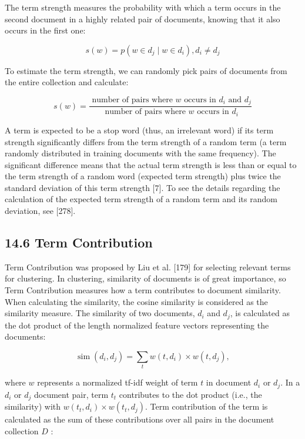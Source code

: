\documentclass[10pt]{book}
\begin{document}
The term strength measures the probability with which a term occurs in the second document in a highly related pair of documents, knowing that it also occurs in the first one:


\begin{equation*}
s(w)=p\left(w \in d_{j} \mid w \in d_{i}\right), d_{i} \neq d_{j} \tag{14.21}
\end{equation*}


To estimate the term strength, we can randomly pick pairs of documents from the entire collection and calculate:


\begin{equation*}
s(w)=\frac{\text { number of pairs where } w \text { occurs in } d_{i} \text { and } d_{j}}{\text { number of pairs where } w \text { occurs in } d_{i}} \tag{14.22}
\end{equation*}


A term is expected to be a stop word (thus, an irrelevant word) if its term strength significantly differs from the term strength of a random term (a term randomly distributed in training documents with the same frequency). The significant difference means that the actual term strength is less than or equal to the term strength of a random word (expected term strength) plus twice the standard deviation of this term strength [7]. To see the details regarding the calculation of the expected term strength of a random term and its random deviation, see [278].

\subsection*{14.6 Term Contribution}
Term Contribution was proposed by Liu et al. [179] for selecting relevant terms for clustering. In clustering, similarity of documents is of great importance, so Term Contribution measures how a term contributes to document similarity. When calculating the similarity, the cosine similarity is considered as the similarity measure. The similarity of two documents, $d_{i}$ and $d_{j}$, is calculated as the dot product of the length normalized feature vectors representing the documents:


\begin{equation*}
\operatorname{sim}\left(d_{i}, d_{j}\right)=\sum_{t} w\left(t, d_{i}\right) \times w\left(t, d_{j}\right), \tag{14.23}
\end{equation*}


where $w$ represents a normalized tf-idf weight of term $t$ in document $d_{i}$ or $d_{j}$. In a $d_{i}$ or $d_{j}$ document pair, term $t_{t}$ contributes to the dot product (i.e., the similarity) with $w\left(t_{t}, d_{i}\right) \times w\left(t_{t}, d_{j}\right)$. Term contribution of the term is calculated as the sum of these contributions over all pairs in the document collection $D$ :
\end{document}
